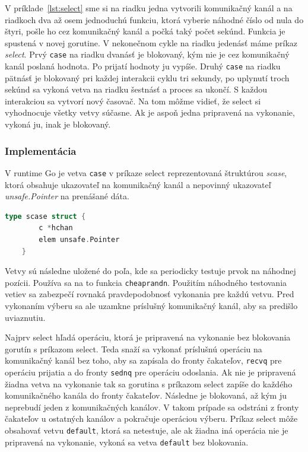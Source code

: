 \documentclass[
  biblatex,
  seconds=true,
  language=slovak,
  figures=false,
  urldate=iso,
  glossaries,
  index
]{kidiplom}
\begin{document}
V príklade~\ref{lst:select} sme si na riadku jedna vytvorili komunikačný kanál a na riadkoch dva až osem jednoduchú funkciu, ktorá vyberie náhodné číslo od nula do štyri,
pošle ho cez komunikačný kanál a počká
taký počet sekúnd. Funkcia je spustená v novej gorutine. V nekonečnom cykle na riadku jedenásť máme príkaz \emph{select}. Prvý \texttt{case} na riadku dvanásť je blokovaný, kým nie je cez komunikačný kanál poslaná hodnota. Po prijatí hodnoty ju vypíše. Druhý \texttt{case} na riadku pätnásť je blokovaný pri každej interakcii cyklu tri sekundy, po uplynutí troch sekúnd sa vykoná vetva na riadku šestnásť a proces sa ukončí. S každou interakciou sa vytvorí nový časovač.
Na tom môžme vidieť, že select si vyhodnocuje
všetky vetvy súčasne. Ak je aspoň jedna pripravená na vykonanie, vykoná ju, inak je blokovaný.

\subsubsection{Implementácia}
V runtime Go je vetva \texttt{case} v príkaze select reprezentovaná štruktúrou \emph{scase}, ktorá obsahuje
ukazovateľ na komunikačný kanál a nepovinný ukazovateľ \emph{unsafe.Pointer} na prenášané dáta.\cite{select}
\newpage
\begin{lstlisting}[language=Go]
	type scase struct {
		c *hchan
		elem unsafe.Pointer
	}
\end{lstlisting}
Vetvy sú následne uložené do poľa, kde sa periodicky testuje prvok na náhodnej pozícii. Používa sa na to funkcia \texttt{cheaprandn}.
Použitím náhodného testovania vetiev sa zabezpečí rovnaká pravdepodobnosť vykonania pre každú vetvu.
Pred vykonaním výberu sa ale uzamkne príslušný komunikačný kanál, aby sa predišlo uviaznutiu.

Najprv select hľadá operáciu, ktorá je pripravená na vykonanie bez blokovania gorutín s príkazom select. Teda snaží sa vykonať
príslušnú operáciu na komunikačný kanál bez toho, aby sa zapísala do fronty čakateľov, \texttt{recvq} pre operáciu prijatia a do fronty
\texttt{sednq} pre operáciu odoslania.
Ak nie je pripravená žiadna vetva na vykonanie
tak sa gorutina s príkazom select zapíše do každého komunikačného kanála do fronty čakateľov.
Následne je blokovaná, až kým ju neprebudí jeden z komunikačných kanálov. V takom prípade
sa odstráni z fronty čakateľov u ostatných kanálov a pokračuje operáciou výberu. Príkaz select môže obsahovať vetvu \texttt{default}, ktorá sa netestuje, ale
ak žiadna iná operácia nie je pripravená na vykonanie, vykoná sa vetva \texttt{default} bez blokovania.
\end{document}
